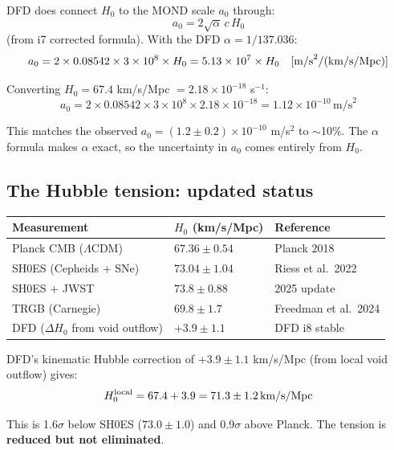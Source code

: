 \documentclass[11pt,a4paper]{article}
\begin{document}
DFD does connect $H_0$ to the MOND scale $a_0$ through:
\begin{equation}
a_0 = 2\sqrt{\alpha}\,c\,H_0
\end{equation}
(from i7 corrected formula). With the DFD $\alpha = 1/137.036$:
\begin{equation}
a_0 = 2 \times 0.08542 \times 3 \times 10^8 \times H_0 = 5.13 \times 10^7 \times H_0 \quad [\text{m/s}^2 / ({\rm km/s/Mpc})]
\end{equation}

Converting $H_0 = 67.4$ km/s/Mpc $= 2.18 \times 10^{-18}$ s$^{-1}$:
\begin{equation}
a_0 = 2 \times 0.08542 \times 3 \times 10^8 \times 2.18 \times 10^{-18} = 1.12 \times 10^{-10}\,\text{m/s}^2
\end{equation}

This matches the observed $a_0 = (1.2 \pm 0.2) \times 10^{-10}$ m/s$^2$ to $\sim$10\%. The $\alpha$ formula makes $\alpha$ exact, so the uncertainty in $a_0$ comes entirely from $H_0$.

\subsection{The Hubble tension: updated status}

\begin{center}
\begin{tabular}{lll}
\toprule
\textbf{Measurement} & $H_0$ (km/s/Mpc) & \textbf{Reference} \\
\midrule
Planck CMB ($\Lambda$CDM) & $67.36 \pm 0.54$ & Planck 2018 \\
SH0ES (Cepheids + SNe) & $73.04 \pm 1.04$ & Riess et al.\ 2022 \\
SH0ES + JWST & $73.8 \pm 0.88$ & 2025 update \\
TRGB (Carnegie) & $69.8 \pm 1.7$ & Freedman et al.\ 2024 \\
DFD ($\Delta H_0$ from void outflow) & $+3.9 \pm 1.1$ & DFD i8 stable \\
\bottomrule
\end{tabular}
\end{center}

DFD's kinematic Hubble correction of $+3.9 \pm 1.1$ km/s/Mpc (from local void outflow) gives:
\begin{equation}
H_0^{\rm local} = 67.4 + 3.9 = 71.3 \pm 1.2\,\text{km/s/Mpc}
\end{equation}

This is 1.6$\sigma$ below SH0ES ($73.0 \pm 1.0$) and 0.9$\sigma$ above Planck. The tension is \textbf{reduced but not eliminated}.
\end{document}
